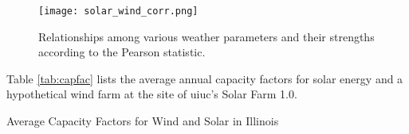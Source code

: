 \begin{figure}[H]
  \centering
  \texttt{[image: solar\_wind\_corr.png]}
  \caption{Relationships among various weather parameters and their strengths
  according to the Pearson statistic.}
  \label{fig:solar-wind-corr}
\end{figure}

Table \ref{tab:capfac} lists the average annual capacity factors for solar energy
and a hypothetical wind farm at the site of \gls{uiuc}'s Solar Farm 1.0.

\begin{table}[H]
  \centering
  \caption{Average Capacity Factors for Wind and Solar in Illinois}
  \label{tab:capfac}
  
\end{table}
